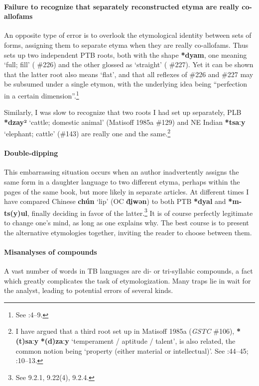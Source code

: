 \paragraph{Failure to recognize that separately reconstructed etyma are really co-allofams}

An opposite type of error is to overlook the etymological identity between sets
of forms, assigning them to separate etyma when they are really co-allofams.
Thus \textit{} sets up two independent PTB roots, both with the shape \textbf{*dyam}, one
meaning ‘full; fill’ (\textit{} \#226) and the other glossed as ‘straight’ (\textit{} \#227).
Yet it can be shown that the latter root also means ‘flat’, and that all
reflexes of \#226 and \#227 may be subsumed under a single etymon, with the
underlying idea being “perfection in a certain dimension”.\footnote{See \citealt{JAM-DL}:4–9.}


Similarly, I was slow to recognize that two roots I had set up separately,
PLB \textbf{*dzay²} ‘cattle; domestic animal’ (Matisoff 1985a \#129)
and NE Indian \textbf{*tsaːy} ‘elephant;
cattle’ (\#143) are really one and the same.\footnote{I have argued that a
third root set up in Matisoff 1985a (\textit{GSTC} \#106), \textbf{*(t)saːy}  \textbf{*(d)zaːy} ‘temperament / aptitude / talent’, is also related, the common notion being ‘property (either material or
intellectual)’. See \citealt{JAM-GSTC}:44–45; \citeyear{JAM-DL}:10–13.}

\paragraph{Double-dipping}
This embarrassing situation occurs when an author inadvertently assigns the same
form in a daughter language to two different etyma, perhaps within the pages of
the same book, but more likely in separate articles. At different times I have
compared Chinese \textbf{chún}  ‘lip’ (OC \textbf{d̑i̯wən}) to both PTB \textbf{*dyal}
and \textbf{*m-ts(y)ul}, finally deciding in favor of the latter.\footnote{See \textit{}
9.2.1, 9.22(4), 9.2.4.}  It
is of course perfectly legitimate to change one’s mind, as long as one explains
why. The best course is to present the alternative etymologies together,
inviting the reader to choose between them.

\paragraph{Misanalyses of compounds}
A vast number of words in TB languages are di- or tri-syllabic compounds, a fact
which greatly complicates the task of etymologization. Many traps lie in wait
for the analyst, leading to potential errors of several kinds.

